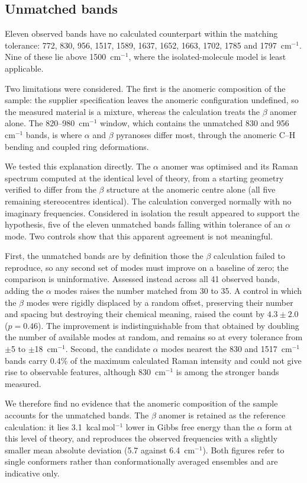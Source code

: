 \documentclass[preprint,12pt]{elsarticle}
\newcommand{\wn}{\ensuremath{\mathrm{cm}^{-1}}}
\begin{document}
\subsection{Unmatched bands}
\label{sec:unmatched}

Eleven observed bands have no calculated counterpart within the matching
tolerance: 772, 830, 956, 1517, 1589, 1637, 1652, 1663, 1702, 1785 and
1797~\wn{}. Nine of these lie above 1500~\wn{}, where the isolated-molecule
model is least applicable.

Two limitations were considered. The first is the anomeric composition of the
sample: the supplier specification leaves the anomeric configuration undefined,
so the measured material is a mixture, whereas the calculation treats the
$\beta$ anomer alone. The 820--980~\wn{} window, which contains the unmatched
830 and 956~\wn{} bands, is where $\alpha$ and $\beta$ pyranoses differ most,
through the anomeric C--H bending and coupled ring deformations.

We tested this explanation directly. The $\alpha$ anomer was optimised and its
Raman spectrum computed at the identical level of theory, from a starting
geometry verified to differ from the $\beta$ structure at the anomeric centre
alone (all five remaining stereocentres identical). The calculation converged
normally with no imaginary frequencies. Considered in isolation the result
appeared to support the hypothesis, five of the eleven unmatched bands falling
within tolerance of an $\alpha$ mode. Two controls show that this apparent
agreement is not meaningful.

First, the unmatched bands are by definition those the $\beta$ calculation
failed to reproduce, so any second set of modes must improve on a baseline of
zero; the comparison is uninformative. Assessed instead across all 41 observed
bands, adding the $\alpha$ modes raises the number matched from 30 to 35. A
control in which the $\beta$ modes were rigidly displaced by a random offset,
preserving their number and spacing but destroying their chemical meaning,
raised the count by $4.3 \pm 2.0$ ($p = 0.46$). The improvement is
indistinguishable from that obtained by doubling the number of available modes
at random, and remains so at every tolerance from $\pm$5 to $\pm$18~\wn{}.
Second, the candidate $\alpha$ modes nearest the 830 and 1517~\wn{} bands carry
0.4\% of the maximum calculated Raman intensity and could not give rise to
observable features, although 830~\wn{} is among the stronger bands measured.

We therefore find no evidence that the anomeric composition of the sample
accounts for the unmatched bands. The $\beta$ anomer is retained as the
reference calculation: it lies 3.1~kcal\,mol$^{-1}$ lower in Gibbs free energy
than the $\alpha$ form at this level of theory, and reproduces the observed
frequencies with a slightly smaller mean absolute deviation (5.7 against
6.4~\wn{}). Both figures refer to single conformers rather than
conformationally averaged ensembles and are indicative only.
\end{document}
